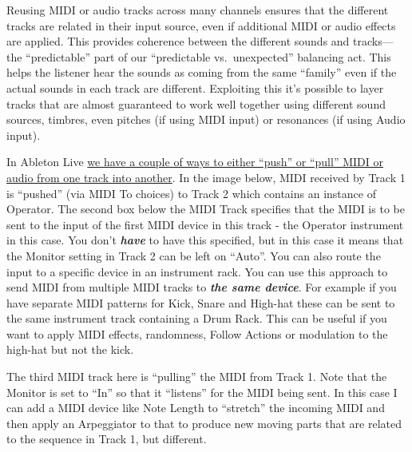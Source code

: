 \documentclass[
  12pt,
  letterpaper,
  oneside,
  open=any]{scrbook}
\begin{document}
\begin{tcolorbox}[enhanced jigsaw, breakable, left=2mm, leftrule=.75mm, toprule=.15mm, opacitybacktitle=0.6, toptitle=1mm, coltitle=black, colback=white, colbacktitle=quarto-callout-tip-color!10!white, opacityback=0, rightrule=.15mm, bottomrule=.15mm, titlerule=0mm, title=\textcolor{quarto-callout-tip-color}{\faLightbulb}\hspace{0.5em}{Key idea}, arc=.35mm, bottomtitle=1mm, colframe=quarto-callout-tip-color-frame]

Reusing MIDI or audio tracks across many channels ensures that the
different tracks are related in their input source, even if additional
MIDI or audio effects are applied. This provides coherence between the
different sounds and tracks---the ``predictable'' part of our
``predictable vs.~unexpected'' balancing act. This helps the listener
hear the sounds as coming from the same ``family'' even if the actual
sounds in each track are different. Exploiting this it's possible to
layer tracks that are almost guaranteed to work well together using
different sound sources, timbres, even pitches (if using MIDI input) or
resonances (if using Audio input).

\end{tcolorbox}

In Ableton Live
\href{https://www.ableton.com/en/live-manual/11/routing-and-i-o/\#routing-and-io}{we
have a couple of ways to either ``push'' or ``pull'' MIDI or audio from
one track into another}. In the image below, MIDI received by Track 1 is
``pushed'' (via MIDI To choices) to Track 2 which contains an instance
of Operator. The second box below the MIDI Track specifies that the MIDI
is to be sent to the input of the first MIDI device in this track - the
Operator instrument in this case. You don't \textbf{\emph{have}} to have
this specified, but in this case it means that the Monitor setting in
Track 2 can be left on ``Auto''. You can also route the input to a
specific device in an instrument rack. You can use this approach to send
MIDI from multiple MIDI tracks to \textbf{\emph{the same device}}. For
example if you have separate MIDI patterns for Kick, Snare and High-hat
these can be sent to the same instrument track containing a Drum Rack.
This can be useful if you want to apply MIDI effects, randomness, Follow
Actions or modulation to the high-hat but not the kick.

The third MIDI track here is ``pulling'' the MIDI from Track 1. Note
that the Monitor is set to ``In'' so that it ``listens'' for the MIDI
being sent. In this case I can add a MIDI device like Note Length to
``stretch'' the incoming MIDI and then apply an Arpeggiator to that to
produce new moving parts that are related to the sequence in Track 1,
but different.
\end{document}
